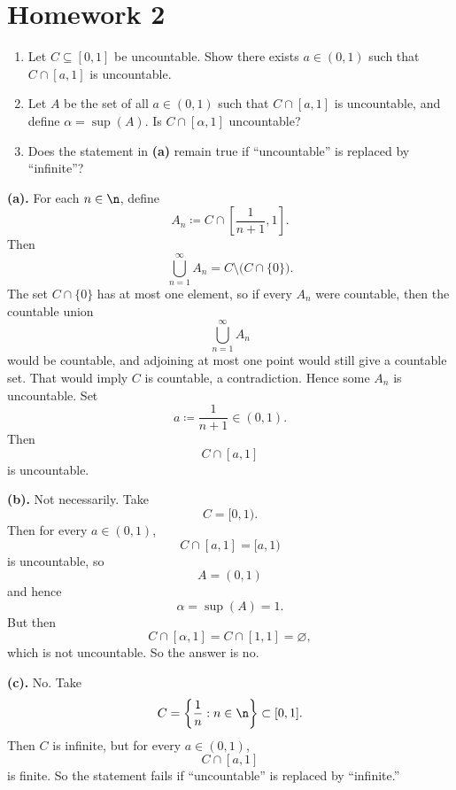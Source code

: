 
\section{Homework 2}

\begin{problem}{
    \begin{enumerate}[label={(\alph*)}]
\item Let $C\subseteq[0,1]$ be uncountable.
Show there exists $a\in(0,1)$ such that $C\cap[a,1]$ is uncountable.
\item Let $A$ be the set of all $a\in(0,1)$ such that $C\cap[a,1]$ is uncountable, and define $\alpha=\sup(A)$.
Is $C\cap[\alpha,1]$ uncountable?
\item Does the statement in \textbf{(a)} remain true if “uncountable” is replaced by “infinite”?
    \end{enumerate}
}
    \textbf{(a).}
    For each $n\in\n$, define
    \[
        A_n\coloneqq C\cap\left[\frac{1}{n+1},1\right].
    \]
    Then
    \[
        \bigcup_{n=1}^\infty A_n=C\setminus\bigl(C\cap\{0\}\bigr).
    \]
    The set $C\cap\{0\}$ has at most one element, so if every $A_n$ were countable, then the countable union
    \[
        \bigcup_{n=1}^\infty A_n
    \]
    would be countable, and adjoining at most one point would still give a countable set.
    That would imply $C$ is countable, a contradiction.
    Hence some $A_n$ is uncountable.
    Set
    \[
        a\coloneqq\frac{1}{n+1}\in(0,1).
    \]
    Then
    \[
        C\cap[a,1]
    \]
    is uncountable.

    \textbf{(b).}
    Not necessarily.
    Take
    \[
        C=[0,1).
    \]
    Then for every $a\in(0,1)$,
    \[
        C\cap[a,1]=[a,1)
    \]
    is uncountable, so
    \[
        A=(0,1)
    \]
    and hence
    \[
        \alpha=\sup(A)=1.
    \]
    But then
    \[
        C\cap[\alpha,1]=C\cap[1,1]=\varnothing,
    \]
    which is not uncountable.
    So the answer is no.

    \textbf{(c).}
    No.
    Take
    \[
        C=\left\{\frac{1}{n}:n\in\n\right\}\subset[0,1].
    \]
    Then $C$ is infinite, but for every $a\in(0,1)$,
    \[
        C\cap[a,1]
    \]
    is finite.
    So the statement fails if “uncountable” is replaced by “infinite.”
\end{problem}

